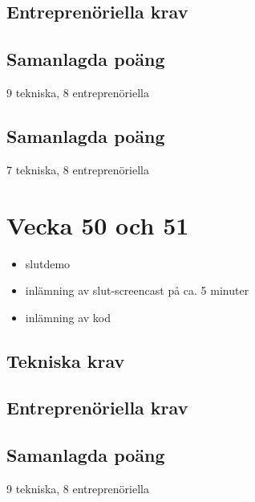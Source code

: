 \documentclass{TDP003mall}
\begin{document}
\subsection{Entreprenöriella krav}

\subsection{Samanlagda poäng}
9 tekniska, 8 entreprenöriella

\subsection{Samanlagda poäng}
7 tekniska, 8 entreprenöriella

\section{Vecka 50 och 51}
\begin{itemize}
    \item slutdemo
    \item inlämning av slut-screencast på ca. 5 minuter
    \item inlämning av kod
\end{itemize}

\subsection{Tekniska krav}

\subsection{Entreprenöriella krav}

\subsection{Samanlagda poäng}
9 tekniska, 8 entreprenöriella


% 
% 
\end{document}
